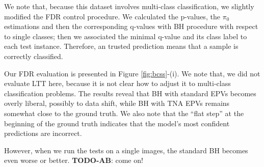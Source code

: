 \documentclass{article}
\newcommand{\todo}[2]{{\color{red} {\bf TODO-#1}: #2}}
\begin{document}
We note that, because this dataset involves multi-class classification, we slightly modified the FDR control procedure. We calculated the p-values, the $\pi_0$ estimations and then the corresponding q-values with BH procedure with respect to single classes; then we associated the minimal q-value and its class label  to each test instance. Therefore, an trusted prediction means that a sample is correctly classified.

Our FDR evaluation is presented in Figure \ref{fig:bcss}-(i). We note that, we did not evaluate LTT here, because it is not clear how to adjust it to multi-class classification problems. The results reveal that BH with standard EPVs becomes overly liberal, possibly to data shift, while BH with TNA EPVs remains somewhat close to the ground truth. We also note that the ``flat step'' at the beginning of the ground truth indicates that the model's most confident predictions are incorrect. 

However, when we run the tests on a single images,  the standard BH becomes even worse or better. \todo{AB}{come on!} 
\end{document}
